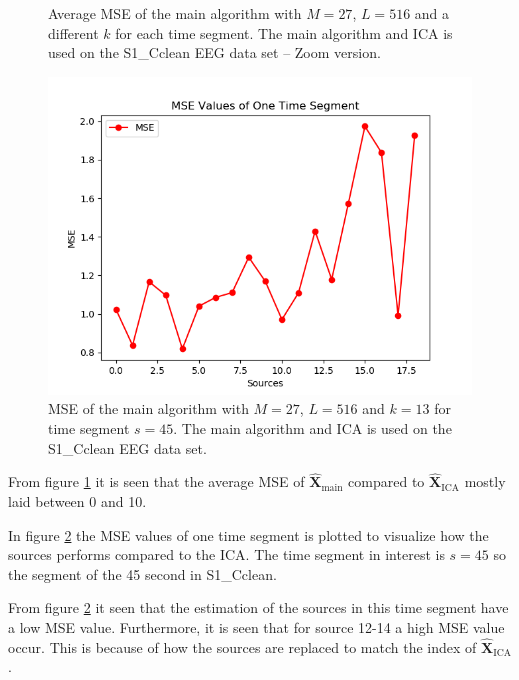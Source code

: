 \begin{figure}[H]
\begin{minipage}[t]{.45\textwidth}
	\caption{Average MSE of the main algorithm with $M=27$, $L = 516$ and a different $k$ for each time segment. The main algorithm and ICA is used on the S1\_Cclean EEG data set -- Zoom version.}
	\label{fig:M=N_1_2}
    \end{minipage}
\end{figure}
\noindent 
 
\begin{figure}[H]
\centering
\includegraphics[scale=0.5]{figures/ch_7/MSE_M=N.png}
\caption{MSE of the main algorithm with $M=27$, $L = 516$ and $k=13$ for time segment $s=45$. The main algorithm and ICA is used on the S1\_Cclean EEG data set.}
\label{fig:M=N_2}
\end{figure}
\noindent
From figure \ref{fig:M=N_1_2} it is seen that the average MSE of $\hat{\mathbf{X}}_{\text{main}}$ compared to $\hat{\mathbf{X}}_{\text{ICA}}$ mostly laid between 0 and 10. 

In figure \ref{fig:M=N_2} the MSE values of one time segment is plotted to visualize how the sources performs compared to the ICA. The time segment in interest is $s = 45$ so the segment of the 45 second in S1\_Cclean. 

From figure \ref{fig:M=N_2} it seen that the estimation of the sources in this time segment have a low MSE value. Furthermore, it is seen that for source 12-14 a high MSE value occur. This is because of how the sources are replaced to match the index of $\hat{\mathbf{X}}_{\text{ICA}}$.

